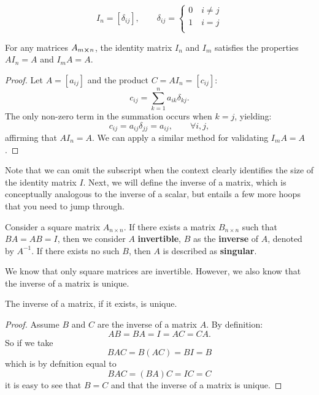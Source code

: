 \documentclass[12pt]{article}
\begin{document}
$$
I_n = [\delta_{ij}], \qquad \delta_{ij} = \begin{cases}
    0 \quad i \neq j \\
    1 \quad i = j \\
\end{cases}
$$

\begin{theorem}
    For any matrices $A_{m \cross n}$, the identity matrix $I_n$ and $I_m$ satisfies the properties $A I_n = A$ and $I_m A = A$. 
\end{theorem}

\begin{proof}
    Let $A = [a_{ij}]$ and the product $C = AI_n = [c_{ij}]$:
    $$c_{ij} = \sum_{k = 1}^{n} a_{ik} \delta_{kj}. $$
    The only non-zero term in the summation occurs when $k = j$, yielding:
    $$c_{ij} = a_{ij}\delta_{jj} = a_{ij}, \qquad \forall i, j,$$
    affirming that $A I_n = A$. We can apply a similar method for validating $I_m A = A$.
\end{proof}

Note that we can omit the subscript when the context clearly identifies the size of the identity matrix $I$. Next, we will define the inverse of a matrix, which is conceptually analogous to the inverse of a scalar, but entails a few more hoops that you need to jump through.

\begin{definition}
    Consider a square matrix $A_{n \times n}$. If there exists a matrix $B_{n \times n}$ such that $BA = AB = I$, then we consider $A$ \textbf{invertible}, $B$ as the \textbf{inverse} of $A$, denoted by $A^{-1}$. If there exists no such $B$, then $A$ is described as \textbf{singular}. 
\end{definition}

We know that only square matrices are invertible. However, we also know that the inverse of a matrix is unique. 

\begin{theorem}
    The inverse of a matrix, if it exists, is unique. 
\end{theorem}

\begin{proof}
    Assume $B$ and $C$ are the inverse of a matrix $A$. By definition:
    $$AB = BA = I = AC = CA.$$
    So if we take 
    $$BAC = B (AC) = BI = B$$
    which is by defnition equal to 
    $$BAC = (BA)C = IC = C$$
    it is easy to see that $B = C$ and that the inverse of a matrix is unique.
\end{proof}
\end{document}
